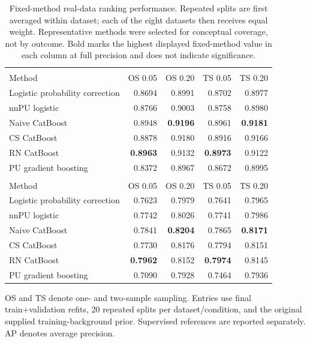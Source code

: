 \begin{table}[t]
\centering
\caption{Fixed-method real-data ranking performance. Repeated splits are first averaged within dataset; each of the eight datasets then receives equal weight. Representative methods were selected for conceptual coverage, not by outcome. Bold marks the highest displayed fixed-method value in each column at full precision and does not indicate significance.}
\label{tab:real-fixed-methods}
\small
\setlength{\tabcolsep}{3.5pt}
\renewcommand{\arraystretch}{1.08}
\begin{tabularx}{\textwidth}{>{\raggedright\arraybackslash}Xrrrr}
\toprule
\multicolumn{5}{l}{\textbf{Panel A: AUROC}} \\
Method & OS 0.05 & OS 0.20 & TS 0.05 & TS 0.20 \\
\midrule
Logistic probability correction & 0.8694 & 0.8991 & 0.8702 & 0.8977 \\
nnPU logistic & 0.8766 & 0.9003 & 0.8758 & 0.8980 \\
Naive CatBoost & 0.8948 & \textbf{0.9196} & 0.8961 & \textbf{0.9181} \\
CS CatBoost & 0.8878 & 0.9180 & 0.8916 & 0.9166 \\
RN CatBoost & \textbf{0.8963} & 0.9132 & \textbf{0.8973} & 0.9122 \\
PU gradient boosting & 0.8372 & 0.8967 & 0.8672 & 0.8995 \\
\midrule
\multicolumn{5}{l}{\textbf{Panel B: AP}} \\
Method & OS 0.05 & OS 0.20 & TS 0.05 & TS 0.20 \\
\midrule
Logistic probability correction & 0.7623 & 0.7979 & 0.7641 & 0.7965 \\
nnPU logistic & 0.7742 & 0.8026 & 0.7741 & 0.7986 \\
Naive CatBoost & 0.7841 & \textbf{0.8204} & 0.7865 & \textbf{0.8171} \\
CS CatBoost & 0.7730 & 0.8176 & 0.7794 & 0.8151 \\
RN CatBoost & \textbf{0.7962} & 0.8152 & \textbf{0.7974} & 0.8145 \\
PU gradient boosting & 0.7090 & 0.7928 & 0.7464 & 0.7936 \\
\bottomrule
\end{tabularx}
\par\medskip
\begin{minipage}{\textwidth}\small
OS and TS denote one- and two-sample sampling. Entries use final train+validation refits, 20 repeated splits per dataset/condition, and the original supplied training-background prior. Supervised references are reported separately. AP denotes average precision.
\end{minipage}
\end{table}
